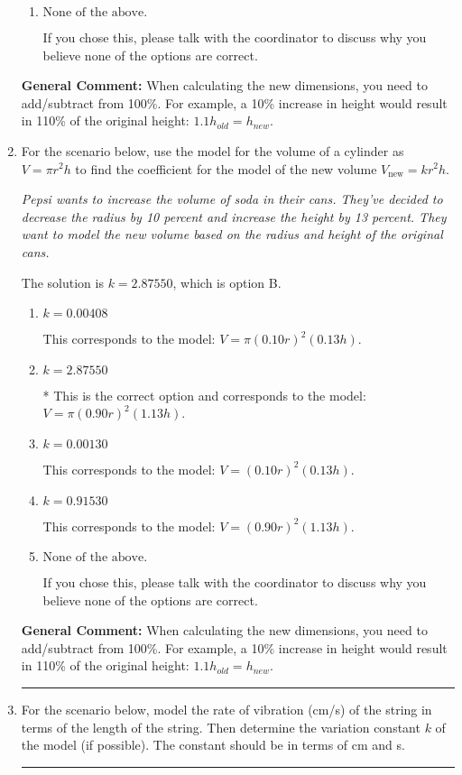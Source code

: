 \documentclass{extbook}[14pt]
\newcommand{\litem}[1]{\item #1

\rule{\textwidth}{0.4pt}}
\begin{document}
\begin{enumerate}
{\begin{enumerate}[label=\Alph*.]
This corresponds to the model: $V = (0.90 r)^2 (1.17 h)$.
\item \( \text{None of the above.} \)

If you chose this, please talk with the coordinator to discuss why you believe none of the options are correct.
\end{enumerate}

\textbf{General Comment:} When calculating the new dimensions, you need to add/subtract from 100\%. For example, a 10\% increase in height would result in 110\% of the original height: $1.1h_{old} = h_{new}$.
}
\litem{
For the scenario below, use the model for the volume of a cylinder as $V = \pi r^2 h$ to find the coefficient for the model of the new volume $V_{\text{new}} = k r^2 h$.

\begin{center}
    \textit{ Pepsi wants to increase the volume of soda in their cans. They've decided to decrease the radius by 10 percent and increase the height by 13 percent. They want to model the new volume based on the radius and height of the original cans. }
\end{center}
The solution is \( k = 2.87550 \), which is option B.\begin{enumerate}[label=\Alph*.]
\item \( k = 0.00408 \)

This corresponds to the model: $V = \pi (0.10 r)^2 (0.13 h)$.
\item \( k = 2.87550 \)

* This is the correct option and corresponds to the model: $V = \pi (0.90 r)^2 (1.13 h)$.
\item \( k = 0.00130 \)

This corresponds to the model: $V = (0.10 r)^2 (0.13 h)$.
\item \( k = 0.91530 \)

This corresponds to the model: $V = (0.90 r)^2 (1.13 h)$.
\item \( \text{None of the above.} \)

If you chose this, please talk with the coordinator to discuss why you believe none of the options are correct.
\end{enumerate}

\textbf{General Comment:} When calculating the new dimensions, you need to add/subtract from 100\%. For example, a 10\% increase in height would result in 110\% of the original height: $1.1h_{old} = h_{new}$.
}
\litem{
For the scenario below, model the rate of vibration (cm/s) of the string in terms of the length of the string. Then determine the variation constant $k$ of the model (if possible). The constant should be in terms of cm and s.

}
\end{enumerate}
\end{document}
